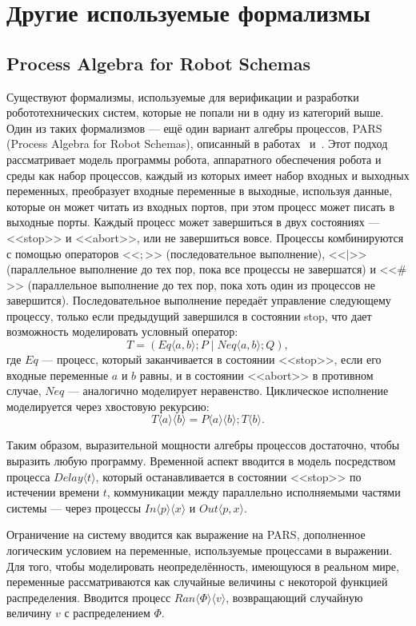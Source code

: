 \documentclass[conference]{IEEEtran}
\begin{document}
\section{Другие используемые формализмы}

\subsection{Process Algebra for Robot Schemas}

Существуют формализмы, используемые для верификации и разработки 
робототехнических систем, которые не попали ни в одну из категорий выше. 
Один из таких формализмов --- ещё один вариант алгебры процессов, 
PARS (Process Algebra for Robot Schemas), описанный в работах~\cite{lyons2015performance} 
и~\cite{lyons2013software}. Этот подход рассматривает модель программы робота, 
аппаратного обеспечения робота и среды как набор процессов, каждый из которых 
имеет набор входных и выходных переменных, преобразует входные переменные в 
выходные, используя данные, которые он может читать из входных портов, при этом 
процесс может писать в выходные порты. Каждый процесс может завершиться 
в двух состояниях --- <<stop>> и <<abort>>, или не завершиться вовсе. Процессы 
комбинируются с помощью операторов <<$;$>> (последовательное выполнение), <<$|$>> 
(параллельное выполнение до тех пор, пока все процессы не завершатся) и <<$\#$>> 
(параллельное выполнение до тех пор, пока хоть один из процессов не завершится). 
Последовательное выполнение передаёт управление следующему процессу, только если 
предыдущий завершился в состоянии stop, что дает возможность моделировать 
условный оператор:
$$T = (Eq\langle a,b\rangle; P\;|\;Neq\langle a,b\rangle;Q),$$
где $Eq$ --- процесс, который заканчивается в состоянии <<stop>>, если 
его входные переменные $a$ и $b$ равны, и в состоянии <<abort>> в противном 
случае, $Neq$ --- аналогично моделирует неравенство. Циклическое 
исполнение моделируется через хвостовую рекурсию: 
$$T\langle a\rangle\langle b\rangle = P\langle a\rangle\langle b\rangle; T\langle b\rangle.$$

Таким образом, выразительной мощности алгебры процессов достаточно, чтобы 
выразить любую программу. Временной аспект вводится в модель посредством 
процесса $Delay\langle t\rangle$, который останавливается в состоянии <<stop>> по 
истечении времени $t$, коммуникации между параллельно исполняемыми частями 
системы --- через процессы $In\langle p\rangle\langle x\rangle$ и $Out\langle p, x\rangle$.

Ограничение на систему вводится как выражение на PARS, дополненное логическим 
условием на переменные, используемые процессами в выражении. Для того, чтобы 
моделировать неопределённость, имеющуюся в реальном мире, переменные 
рассматриваются как случайные величины с некоторой функцией распределения.
Вводится процесс $Ran\langle\Phi\rangle\langle v\rangle$, возвращающий случайную величину 
$v$ с распределением $\Phi$.
\end{document}
